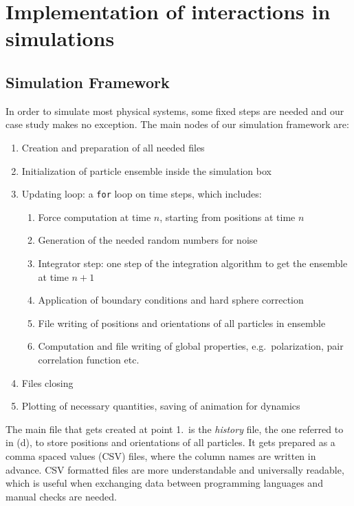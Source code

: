 \documentclass[../../master_thesis_np.tex]{subfiles}
\begin{document}
\chapter[Interaction Implementation]{Implementation of interactions in simulations}
\label{chap:int_impl}

	\section{Simulation Framework}
	In order to simulate most physical systems, some fixed steps are needed and our case study makes no exception. The main nodes of our simulation framework are:
	\begin{enumerate}
		\item Creation and preparation of all needed files
		\item Initialization of particle ensemble inside the simulation box
		\item Updating loop: a \verb|for| loop on time steps, which includes:
		\begin{enumerate}
			\item Force computation at time $n$, starting from positions at time $n$
			\item Generation of the needed random numbers for noise
			\item Integrator step: one step of the integration algorithm to get the ensemble at time $n+1$
			\item Application of boundary conditions and hard sphere correction 
			\item File writing of positions and orientations of all particles in ensemble
			\item Computation and file writing of global properties, e.g.\ polarization, pair correlation function etc.
		\end{enumerate}
		\item Files closing
		\item Plotting of necessary quantities, saving of animation for dynamics
	\end{enumerate}
	
	The main file that gets created at point 1.\ is the \emph{history} file, the one referred to in (d), to store positions and orientations of all particles. It gets prepared as a comma spaced values (CSV) files, where the column names are written in advance. CSV formatted files are more understandable and universally readable, which is useful when exchanging data between programming languages and manual checks are needed.
	
\end{document}
